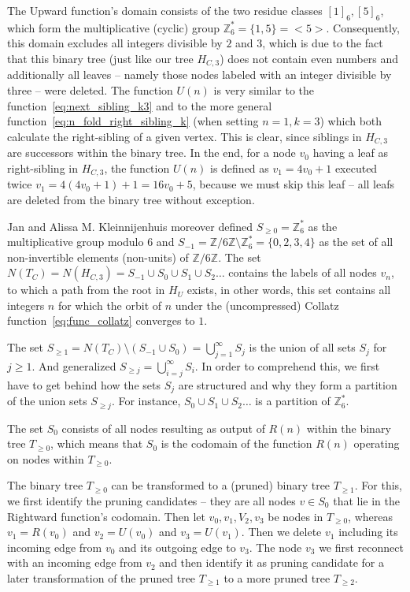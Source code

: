 The Upward function's domain consists of the two residue classes $[1]_6,[5]_6$, which form the multiplicative (cyclic) group $\mathbb{Z}^\ast_6=\{1,5\}=<5>$. Consequently, this domain excludes all integers divisible by $2$ and $3$, which is due to the fact that this binary tree (just like our tree $H_{C,3}$) does not contain even numbers and additionally all leaves -- namely those nodes labeled with an integer divisible by three -- were deleted. The function $U(n)$ is very similar to the function~\ref{eq:next_sibling_k3} and to the more general function~\ref{eq:n_fold_right_sibling_k} (when setting $n=1,k=3$) which both calculate the right-sibling of a given vertex. This is clear, since siblings in $H_{C,3}$ are successors within the binary tree. In the end, for a node $v_0$ having a leaf as right-sibling in $H_{C,3}$, the function $U(n)$ is defined as $v_1=4v_0+1$ executed twice $v_1=4(4v_0+1)+1=16v_0+5$, because we must skip this leaf -- all leafs are deleted from the binary tree without exception.

Jan and Alissa M. Kleinnijenhuis \cite{Ref_Kleinnijenhuis} moreover defined $S_{\ge0}=\mathbb{Z}^\ast_6$ as the multiplicative group modulo $6$ and $S_{-1}=\mathbb{Z}/6\mathbb{Z}\setminus\mathbb{Z}^\ast_6=\{0,2,3,4\}$ as the set of all non-invertible elements (non-units) of $\mathbb{Z}/6\mathbb{Z}$. The set $N(T_C)=N(H_{C,3})=S_{-1}\cup S_0\cup S_1\cup S_2\ldots$ contains the labels of all nodes $v_n$, to which a path from the root in $H_U$ exists, in other words, this set contains all integers $n$ for which the orbit of $n$ under the (uncompressed) Collatz function~\ref{eq:func_collatz} converges to $1$.

The set $S_{\ge1}=N(T_C)\setminus(S_{-1}\cup S_{0})=\bigcup_{j=1}^{\infty}S_j$ is the union of all sets $S_j$ for $j\ge1$. And generalized $S_{\ge j}=\bigcup_{i=j}^{\infty}S_i$. In order to comprehend this, we first have to get behind how the sets $S_j$ are structured and why they form a partition of the union sets $S_{\ge j}$. For instance, $S_0\cup S_1\cup S_2\ldots$ is a partition of $\mathbb{Z}^\ast_6$.

The set $S_0$ consists of all nodes resulting as output of $R(n)$ within the binary tree $T_{\ge0}$, which means that $S_0$ is the codomain of the function $R(n)$ operating on nodes within $T_{\ge0}$.

The binary tree $T_{\ge0}$ can be transformed to a (pruned) binary tree $T_{\ge1}$. For this, we first identify the pruning candidates -- they are all nodes $v\in S_0$ that lie in the Rightward function's codomain. Then let $v_0,v_1,V_2,v_3$ be nodes in $T_{\ge0}$, whereas $v_1=R(v_0)$ and $v_2=U(v_0)$ and $v_3=U(v_1)$. Then we delete $v_1$ including its incoming edge from $v_0$ and its outgoing edge to $v_3$. The node $v_3$ we first reconnect with an incoming edge from $v_2$ and then identify it as pruning candidate for a later transformation of the pruned tree $T_{\ge1}$ to a more pruned tree $T_{\ge2}$.

